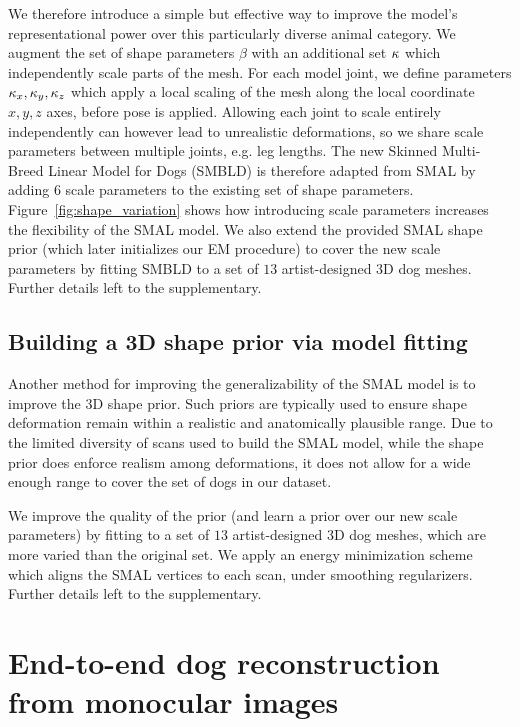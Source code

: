 We therefore introduce a simple but effective way to improve the model's representational power over this particularly diverse  animal category. We augment the set of shape parameters $\beta$ with an additional set $\kappa$ which independently scale parts of the mesh. For each model joint, we define parameters ${\kappa_x,\kappa_y,\kappa_z}$ which apply a local scaling of the mesh along the local coordinate $x, y, z$ axes, before pose is applied. Allowing each joint to scale entirely independently can however lead to unrealistic deformations, so we share scale parameters between multiple joints, e.g. leg lengths. The new Skinned Multi-Breed Linear Model for Dogs (SMBLD) is therefore adapted from SMAL by adding $6$ scale parameters to the existing set of shape parameters. Figure~\ref{fig:shape_variation} shows how introducing scale parameters increases the flexibility of the SMAL model. We also extend the provided SMAL shape prior (which later initializes our EM procedure) to cover the new scale parameters by fitting SMBLD to a set of $13$ artist-designed 3D dog meshes. Further details left to the supplementary.



\subsection{Building a 3D shape prior via model fitting}

Another method for improving the generalizability of the SMAL model is to improve the 3D shape prior. Such priors are typically used to ensure shape deformation remain within a realistic and anatomically plausible range. Due to the limited diversity of scans used to build the SMAL model, while the shape prior does enforce realism among deformations, it does not allow for a wide enough range to cover the set of dogs in our dataset.

We improve the quality of the prior (and learn a prior over our new scale parameters) by fitting to a set of $13$ artist-designed 3D dog meshes, which are more varied than the original set. We apply an energy minimization scheme which aligns the SMAL vertices to each scan, under smoothing regularizers. Further details left to the supplementary.



\section{End-to-end dog reconstruction from monocular images} 

